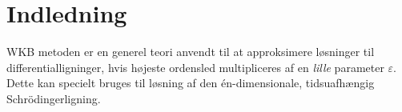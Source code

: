 \section{Indledning}
WKB metoden er en generel teori anvendt til at approksimere løsninger til differentialligninger, hvis højeste ordensled multipliceres af en \emph{lille} parameter $\varepsilon$. Dette kan specielt bruges til løsning af den én-dimensionale, tidsuafhængig Schrödingerligning.

